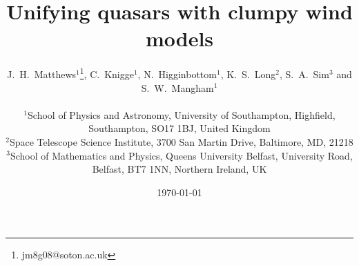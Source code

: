\documentclass[useAMS,usenatbib]{mn2e_x}
\begin{document}


\def\py{\textsc{Python}}
\def\tar{\textsc{Tardis}}
\def\cld{\textsc{Cloudy}}
\def\agn{\textsc{Agnspec}}


\def\civ{C~\textsc{iv}}
\def\nv{N~\textsc{v}}
\def\hei{He~\textsc{i}}
\def\heii{He~\textsc{ii}}
\def\mg{Mg~\textsc{ii}}
\def\al{Al~\textsc{iii}}
\def\heii{He~\textsc{ii}}
\def\ovi{O~\textsc{vi}}
\def\la{Ly~$\alpha$}
\def\ha{H~$\alpha$}
\def\hb{H~$\beta$}



\def\araa{ARAA}
\def\nat{Nature}
\def\apjl{ApJ Letters}
\def\aapr{AAPR}
\def\ssr{SSR}
\def\apj{ApJ}
\def\apjs{ApJs}
\def\pasp{PASP}
\def\aap{A\&A}
\def\mnras{MNRAS}
\def\aj{AJ}
\def\rmxaa{RMXAA}
\def\aaps{A\&As}

%
%

\title
{
Unifying quasars with clumpy wind models
}



\author[Matthews et al.]{
\parbox[t]{\textwidth}{
J.~H.~Matthews$^1$\thanks{jm8g08@soton.ac.uk}, C.~Knigge$^1$,
N.~Higginbottom$^1$, K.~S.~Long$^2$, S.~A.~Sim$^3$ and S.~W.~Mangham$^1$
}
\medskip  
\\$^1$School of Physics and Astronomy, University of Southampton, Highfield, Southampton, SO17 1BJ, United Kingdom
\\$^2$Space Telescope Science Institute, 3700 San Martin Drive, Baltimore, MD, 21218
\\$^3$School of Mathematics and Physics, Queens University Belfast, University Road, Belfast, BT7 1NN, Northern Ireland, UK
}

\date{\today}


%
%
\end{document}
